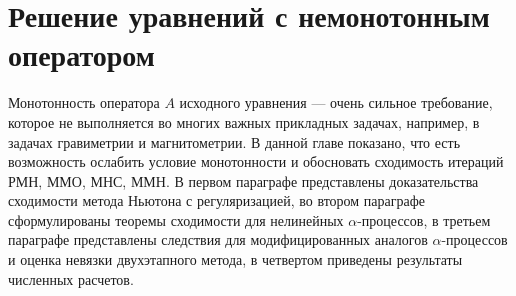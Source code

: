 \chapter{Решение уравнений с немонотонным оператором}
Монотонность оператора $A$ исходного уравнения --- очень сильное требование, которое не выполняется во многих важных прикладных задачах, например, в задачах гравиметрии и магнитометрии. В данной главе показано, что есть возможность ослабить условие монотонности и обосновать сходимость итераций РМН, ММО, МНС, ММН.
В первом параграфе представлены доказательства сходимости метода Ньютона с регуляризацией, во втором параграфе сформулированы теоремы сходимости для нелинейных $\alpha$-процессов, в третьем параграфе представлены следствия для модифицированных аналогов $\alpha$-процессов и оценка невязки двухэтапного метода, в четвертом приведены результаты численных расчетов.

\newpage
